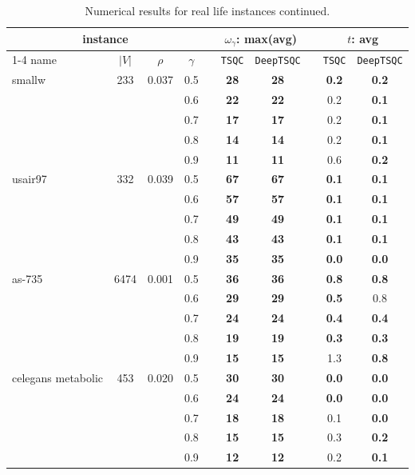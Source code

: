 \begin{table}[h!]
    \footnotesize
    \caption{Numerical results for real life instances continued.}
    \label{tab: real life cont}
    \centering
    \begin{tabular}{l c c c c c c c c c}
    \toprule
    \toprule
    \multicolumn{4}{c}{instance} & & \multicolumn{2}{c}{$\omega_{\gamma}$: max(avg)} & &
    \multicolumn{2}{c}{$t$: avg} \\
    \cmidrule{1-4} \cmidrule{6-7} \cmidrule{9-10}
    name & $|V|$ & $\rho$ & $\gamma$ & & \texttt{TSQC} & \texttt{DeepTSQC} & & \texttt{TSQC} & \texttt{DeepTSQC} \\
    \midrule
smallw & 233 & 0.037 & 0.5 & & \textbf{28} & \textbf{28} & & \textbf{0.2} & \textbf{0.2} \\
& & & 0.6 & & \textbf{22} & \textbf{22} & & 0.2 & \textbf{0.1} \\
& & & 0.7 & & \textbf{17} & \textbf{17} & & 0.2 & \textbf{0.1} \\
& & & 0.8 & & \textbf{14} & \textbf{14} & & 0.2 & \textbf{0.1} \\
& & & 0.9 & & \textbf{11} & \textbf{11} & & 0.6 & \textbf{0.2} \\
\midrule
usair97 & 332 & 0.039 & 0.5 & & \textbf{67} & \textbf{67} & & \textbf{0.1} & \textbf{0.1} \\
& & & 0.6 & & \textbf{57} & \textbf{57} & & \textbf{0.1} & \textbf{0.1} \\
& & & 0.7 & & \textbf{49} & \textbf{49} & & \textbf{0.1} & \textbf{0.1} \\
& & & 0.8 & & \textbf{43} & \textbf{43} & & \textbf{0.1} & \textbf{0.1} \\
& & & 0.9 & & \textbf{35} & \textbf{35} & & \textbf{0.0} & \textbf{0.0} \\
\midrule
as-735 & 6474 & 0.001 & 0.5 & & \textbf{36} & \textbf{36} & & \textbf{0.8} & \textbf{0.8} \\
& & & 0.6 & & \textbf{29} & \textbf{29} & & \textbf{0.5} & 0.8 \\
& & & 0.7 & & \textbf{24} & \textbf{24} & & \textbf{0.4} & \textbf{0.4} \\
& & & 0.8 & & \textbf{19} & \textbf{19} & & \textbf{0.3} & \textbf{0.3} \\
& & & 0.9 & & \textbf{15} & \textbf{15} & & 1.3 & \textbf{0.8} \\
\midrule
celegans metabolic & 453 & 0.020 & 0.5 & & \textbf{30} & \textbf{30} & & \textbf{0.0} & \textbf{0.0} \\
& & & 0.6 & & \textbf{24} & \textbf{24} & & \textbf{0.0} & \textbf{0.0} \\
& & & 0.7 & & \textbf{18} & \textbf{18} & & 0.1 & \textbf{0.0} \\
& & & 0.8 & & \textbf{15} & \textbf{15} & & 0.3 & \textbf{0.2} \\
& & & 0.9 & & \textbf{12} & \textbf{12} & & 0.2 & \textbf{0.1} \\

    \bottomrule
    \bottomrule
    \end{tabular}
    \end{table}